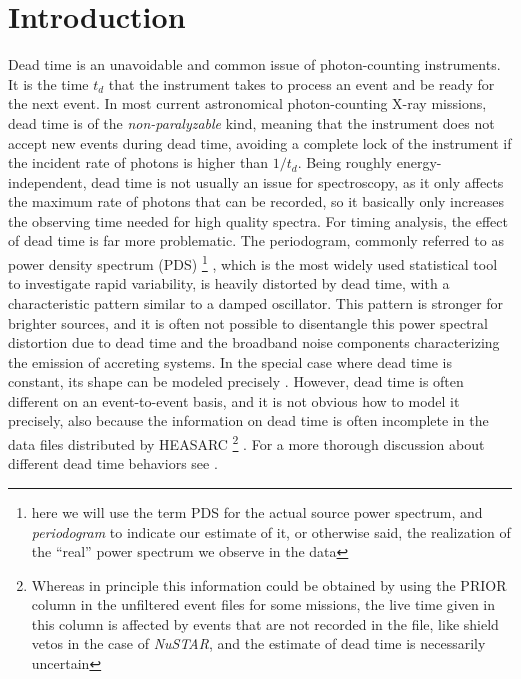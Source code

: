 \documentclass[twocolumn]{aastex61}
\newcommand{\project}[1]{\textsl{#1}}
\newcommand{\nustar}{\project{NuSTAR}\xspace}
\newcommand{\deadt}{\ensuremath{t_d}\xspace}
\begin{document}
\section{Introduction} \label{sec:intro}
Dead time is an unavoidable and common issue of photon-counting instruments.
It is the time $\deadt$ that the instrument takes to process an event and be ready for the next event.
In most current astronomical photon-counting X-ray missions, dead time is of the \textit{non-paralyzable} kind, meaning that the instrument does not accept new events during dead time, avoiding a complete lock of the instrument if the incident rate of photons is higher than $1/\deadt$.
Being roughly energy-independent, dead time is not usually an issue for spectroscopy, as it only affects the maximum rate of photons that can be recorded, so it basically only increases the observing time needed for high quality spectra.
For timing analysis, the effect of dead time is far more problematic.
The periodogram, commonly referred to as power density spectrum (PDS)%
\footnote{here we will use the term PDS for the actual source power spectrum, and \textit{periodogram} to indicate our estimate of it, or otherwise said, the realization of the ``real'' power spectrum we observe in the data}%
, which is the most widely used statistical tool to investigate rapid variability, is heavily distorted by dead time, with a characteristic pattern similar to a damped oscillator.
This pattern is stronger for brighter sources, and it is often not possible to disentangle this power spectral distortion due to dead time and the broadband noise components characterizing the emission of accreting systems.
In the special case where dead time is constant, its shape can be modeled precisely \citep{Zhang+95,Vikhlinin+94}.
However, dead time is often different on an event-to-event basis, and it is not obvious how to model it precisely, also because the information on dead time is often incomplete in the data files distributed by HEASARC%
\footnote{Whereas in principle this information could be obtained by using the PRIOR column in the unfiltered event files for some missions, the live time given in this column is affected by events that are not recorded in the file, like shield vetos in the case of \nustar, and the estimate of dead time is necessarily uncertain}%
.
For a more thorough discussion about different dead time behaviors see \citet{Zhang+95}.
\end{document}
